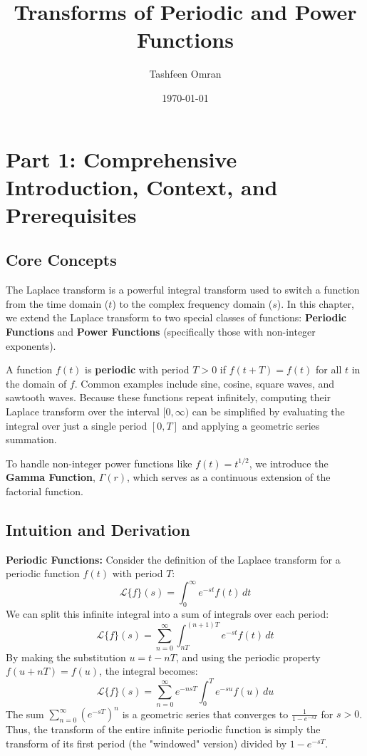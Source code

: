 \documentclass[11pt, letterpaper]{article}
\theoremstyle{definition}
\theoremstyle{remark}
\begin{document}
\title{\textbf{Transforms of Periodic and Power Functions}}
\author{Tashfeen Omran}
\date{\today}
\maketitle

\tableofcontents
\newpage

\section{Part 1: Comprehensive Introduction, Context, and Prerequisites}

\subsection{Core Concepts}
The Laplace transform is a powerful integral transform used to switch a function from the time domain ($t$) to the complex frequency domain ($s$). In this chapter, we extend the Laplace transform to two special classes of functions: \textbf{Periodic Functions} and \textbf{Power Functions} (specifically those with non-integer exponents).

A function $f(t)$ is \textbf{periodic} with period $T > 0$ if $f(t + T) = f(t)$ for all $t$ in the domain of $f$. Common examples include sine, cosine, square waves, and sawtooth waves. Because these functions repeat infinitely, computing their Laplace transform over the interval $[0, \infty)$ can be simplified by evaluating the integral over just a single period $[0, T]$ and applying a geometric series summation.

To handle non-integer power functions like $f(t) = t^{1/2}$, we introduce the \textbf{Gamma Function}, $\Gamma(r)$, which serves as a continuous extension of the factorial function.

\subsection{Intuition and Derivation}
\textbf{Periodic Functions:} 
Consider the definition of the Laplace transform for a periodic function $f(t)$ with period $T$:
\[ \mathcal{L}\{f\}(s) = \int_0^\infty e^{-st} f(t) \, dt \]
We can split this infinite integral into a sum of integrals over each period:
\[ \mathcal{L}\{f\}(s) = \sum_{n=0}^\infty \int_{nT}^{(n+1)T} e^{-st} f(t) \, dt \]
By making the substitution $u = t - nT$, and using the periodic property $f(u + nT) = f(u)$, the integral becomes:
\[ \mathcal{L}\{f\}(s) = \sum_{n=0}^\infty e^{-nsT} \int_0^T e^{-su} f(u) \, du \]
The sum $\sum_{n=0}^\infty (e^{-sT})^n$ is a geometric series that converges to $\frac{1}{1 - e^{-sT}}$ for $s > 0$. Thus, the transform of the entire infinite periodic function is simply the transform of its first period (the "windowed" version) divided by $1 - e^{-sT}$.
\end{document}
